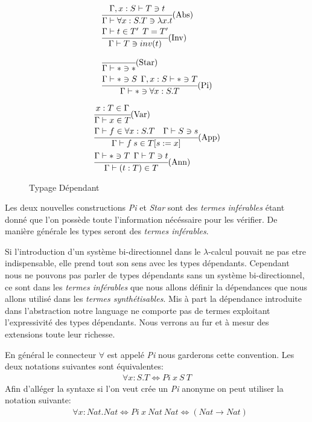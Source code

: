 \documentclass {article}
\theoremstyle{definition}
\theoremstyle{remark}
\begin{document}
\begin{figure}
  \center{}
  
  \begin{align*}
    &\cfrac{\Gamma,x:S\vdash T \ni t}
    {\Gamma \vdash \forall x:S.T \ni \lambda x. t}\mbox{(Abs)} \\
    &\cfrac{\Gamma \vdash t \in T' \:\: T=T'}
    {\Gamma\vdash T \ni inv(t)}\mbox{(Inv)} \\
    &\cfrac{}
    {\Gamma \vdash * \ni *}\mbox{(Star)} \\
    &\cfrac{\Gamma \vdash * \ni S\:\:\Gamma,x:S \vdash *\ni T}
    {\Gamma\vdash * \ni \forall x:S.T}\mbox{(Pi)}
  \end{align*}
  
  \center{}
  
  \begin{align*}
    &\cfrac{x:T \in \Gamma}
    {\Gamma \vdash x \in T }\mbox{(Var)} \\
    &\cfrac{\Gamma \vdash f \in \forall x:S.T \quad \Gamma\vdash S \ni s }
    {\Gamma\vdash f\:s\in T[s := x]}\mbox{(App)} \\
    &\cfrac{\Gamma\vdash * \ni T \:\:\Gamma\vdash T \ni t}
    {\Gamma\vdash (t:T) \in T}\mbox{(Ann)} \\
  \end{align*}
  \caption{Typage Dépendant}
  \label{fig:typage dependant} 
\end{figure}

Les deux nouvelles constructions \emph{Pi} et \emph{Star} sont des \emph{termes inférables} étant donné
que l'on possède toute l'information nécéssaire pour les vérifier. De manière générale les types seront 
des \emph{termes inférables}.

Si l'introduction d'un système bi-directionnel dans le $\lambda$-calcul pouvait ne pas etre indispensable, elle prend tout son 
sens avec les types dépendants.
Cependant nous ne pouvons pas parler de types dépendants sans un système bi-directionnel, ce sont dans les 
\emph{termes inférables} que nous allons définir la dépendances que nous allons utilisé dans les 
\emph{termes synthétisables}.
Mis à part la dépendance introduite dans l'abstraction notre language ne comporte pas de termes exploitant 
l'expressivité des types dépendants. Nous verrons au fur et à mesur des extensions toute leur richesse.

En général le connecteur $\forall$ est appelé \emph{Pi} nous garderons cette convention.
Les deux notations suivantes sont équivalentes: 
\begin{align*}  
  \forall x:S.T \Leftrightarrow Pi\: x\: S\: T
\end{align*}
Afin d'alléger la syntaxe si l'on veut crée un \emph{Pi} anonyme on peut utiliser la notation suivante:
\begin{align*}
  & \forall x:Nat.Nat \Leftrightarrow Pi\: x\: Nat\: Nat \Leftrightarrow (Nat \rightarrow Nat) \\
\end{align*}
\end{document}
